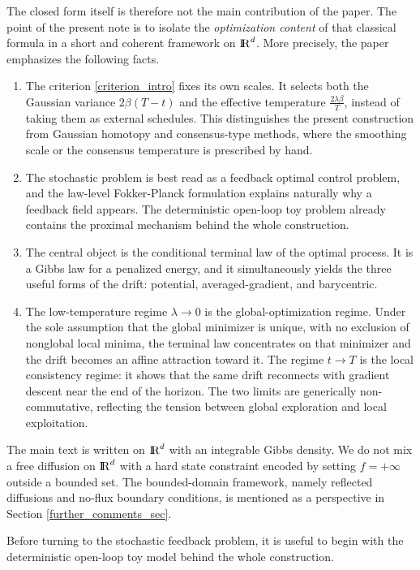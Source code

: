 \documentclass[11pt]{amsart}
\def\R{\mathrm{I\kern-0.21emR}}
\numberwithin{equation}{section}
\numberwithin{figure}{section}
\theoremstyle{definition}\newtheorem{remark}[theorem]{Remark}%
\begin{document}
The closed form itself is therefore not the main contribution of the paper. The point of the present note is to isolate the \emph{optimization content} of that classical formula in a short and coherent framework on $\R^d$. More precisely, the paper emphasizes the following facts.
\begin{enumerate}[label=(\roman*)]
\item The criterion \eqref{criterion_intro} fixes its own scales. It selects both the Gaussian variance $2\beta(T-t)$ and the effective temperature $\frac{2\lambda\beta}{T}$, instead of taking them as external schedules. This distinguishes the present construction from Gaussian homotopy and consensus-type methods, where the smoothing scale or the consensus temperature is prescribed by hand.
\item The stochastic problem is best read as a feedback optimal control problem, and the law-level Fokker-Planck formulation explains naturally why a feedback field appears. The deterministic open-loop toy problem already contains the proximal mechanism behind the whole construction.
\item The central object is the conditional terminal law of the optimal process. It is a Gibbs law for a penalized energy, and it simultaneously yields the three useful forms of the drift: potential, averaged-gradient, and barycentric.
\item The low-temperature regime $\lambda \to 0$ is the global-optimization regime. Under the sole assumption that the global minimizer is unique, with no exclusion of nonglobal local minima, the terminal law concentrates on that minimizer and the drift becomes an affine attraction toward it. The regime $t \to T$ is the local consistency regime: it shows that the same drift reconnects with gradient descent near the end of the horizon. The two limits are generically non-commutative, reflecting the tension between global exploration and local exploitation.
\end{enumerate}

The main text is written on $\R^d$ with an integrable Gibbs density. We do not mix a free diffusion on $\R^d$ with a hard state constraint encoded by setting $f = +\infty$ outside a bounded set. The bounded-domain framework, namely reflected diffusions and no-flux boundary conditions, is mentioned as a perspective in Section \ref{further_comments_sec}.

Before turning to the stochastic feedback problem, it is useful to begin with the deterministic open-loop toy model behind the whole construction.
\end{document}
